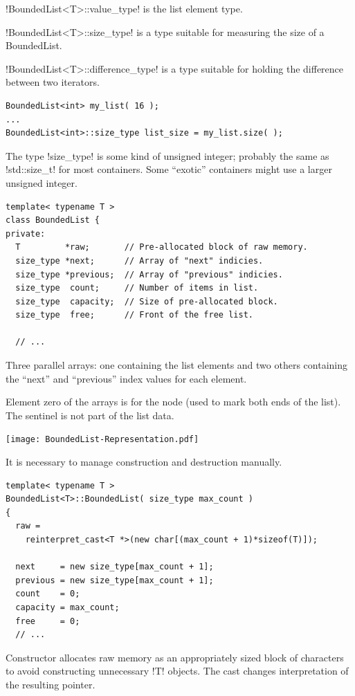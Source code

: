 \documentclass[landscape]{slides}
\begin{document}

\begin{citemize}
\item !BoundedList<T>::value_type! is the list element type.
\item !BoundedList<T>::size_type! is a type suitable for measuring the size of a BoundedList.
\item !BoundedList<T>::difference_type! is a type suitable for holding the difference between
  two iterators.
\end{citemize}
{\small
\begin{lstlisting}
BoundedList<int> my_list( 16 );
...
BoundedList<int>::size_type list_size = my_list.size( );
\end{lstlisting}
}
The type !size_type! is some kind of unsigned integer; probably the same as !std::size_t! for
most containers. Some ``exotic'' containers might use a larger unsigned integer.
\stopslide

{\small
\begin{lstlisting}
template< typename T >
class BoundedList {
private:
  T         *raw;       // Pre-allocated block of raw memory.
  size_type *next;      // Array of "next" indicies.
  size_type *previous;  // Array of "previous" indicies.
  size_type  count;     // Number of items in list.
  size_type  capacity;  // Size of pre-allocated block.
  size_type  free;      // Front of the free list.

  // ...
\end{lstlisting}
}
Three parallel arrays: one containing the list elements and two others containing the ``next''
and ``previous'' index values for each element.

Element zero of the arrays is for the  node (used to mark both ends of the
list). The sentinel is not part of the list data.
\stopslide


\begin{center}
\texttt{[image: BoundedList-Representation.pdf]}
\end{center}
\stopslide


 It is
necessary to manage construction and destruction manually.
\vspace{5mm}
{\small
\begin{lstlisting}
template< typename T >
BoundedList<T>::BoundedList( size_type max_count )
{
  raw =
    reinterpret_cast<T *>(new char[(max_count + 1)*sizeof(T)]);

  next     = new size_type[max_count + 1];
  previous = new size_type[max_count + 1];
  count    = 0;
  capacity = max_count;
  free     = 0;
  // ...
\end{lstlisting}
}
Constructor allocates raw memory as an appropriately sized block of characters to avoid
constructing unnecessary !T! objects. The cast changes interpretation of the resulting pointer.
\end{document}
